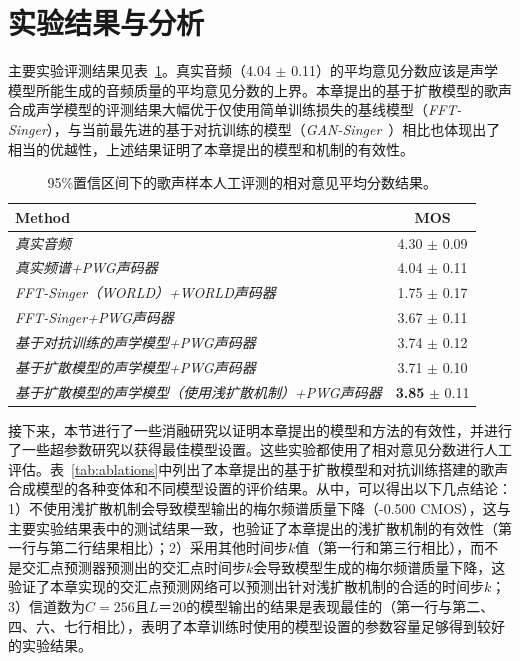 \section{实验结果与分析}
主要实验评测结果见表~\ref{tab:main_exp}。真实音频（4.04 $\pm$ 0.11）的平均意见分数应该是声学模型所能生成的音频质量的平均意见分数的上界。本章提出的基于扩散模型的歌声合成声学模型的评测结果大幅优于仅使用简单训练损失的基线模型（\textit{FFT-Singer}），与当前最先进的基于对抗训练的模型（\textit{GAN-Singer}~\cite{wu2020adversarially}）相比也体现出了相当的优越性，上述结果证明了本章提出的模型和机制的有效性。
\begin{table}[!h]
	\centering
	\setlength{\belowcaptionskip}{8pt} %
	\caption{95\%置信区间下的歌声样本人工评测的相对意见平均分数结果。}
	\begin{tabular}{|l|c|}
		\toprule
		Method &  MOS  \\
		\midrule
		\textit{真实音频} & 4.30 $\pm$ 0.09  \\
	    \textit{真实频谱+PWG声码器} & 4.04 $\pm$ 0.11  \\
		\midrule
		\textit{FFT-Singer（WORLD）+WORLD声码器} & 1.75  $\pm$ 0.17  \\
		\textit{FFT-Singer+PWG声码器} & 3.67 $\pm$ 0.11 \\
		\textit{基于对抗训练的声学模型+PWG声码器} & 3.74 $\pm$ 0.12  \\
		\midrule
		\textit{基于扩散模型的声学模型+PWG声码器} & 3.71 $\pm$ 0.10 \\
		\textit{基于扩散模型的声学模型（使用浅扩散机制）+PWG声码器} & \textbf{3.85} $\pm$ 0.11 \\
		\bottomrule
	\end{tabular}
	\label{tab:main_exp}
\end{table}
接下来，本节进行了一些消融研究以证明本章提出的模型和方法的有效性，并进行了一些超参数研究以获得最佳模型设置。这些实验都使用了相对意见分数进行人工评估。表~\ref{tab:ablations}中列出了本章提出的基于扩散模型和对抗训练搭建的歌声合成模型的各种变体和不同模型设置的评价结果。从中，可以得出以下几点结论：1）不使用浅扩散机制会导致模型输出的梅尔频谱质量下降（-0.500 CMOS），这与主要实验结果表中的测试结果一致，也验证了本章提出的浅扩散机制的有效性（第一行与第二行结果相比）；2）采用其他时间步$k$值（第一行和第三行相比），而不是交汇点预测器预测出的交汇点时间步$k$会导致模型生成的梅尔频谱质量下降，这验证了本章实现的交汇点预测网络可以预测出针对浅扩散机制的合适的时间步$k$；3）信道数为$C=256$且$L＝20$的模型输出的结果是表现最佳的（第一行与第二、四、六、七行相比），表明了本章训练时使用的模型设置的参数容量足够得到较好的实验结果。
